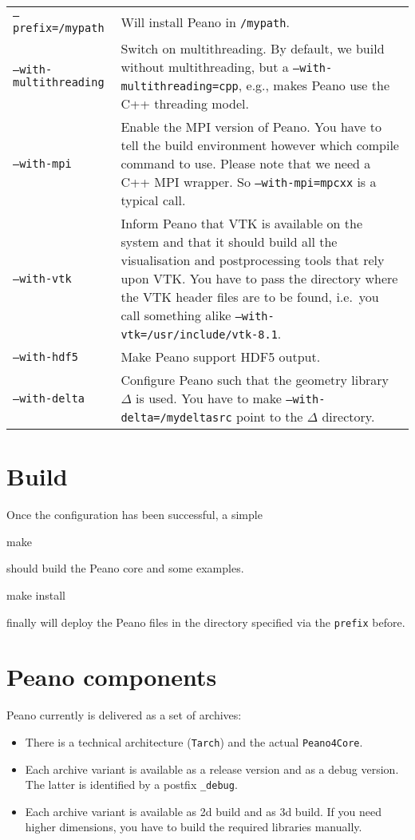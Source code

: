 \begin{center}
 \begin{tabular}{lp{10cm}}
  \texttt{--prefix=/mypath} & Will install Peano in \texttt{/mypath}.
   \\
  \texttt{--with-multithreading} & Switch on multithreading. By default, we
  build without multithreading, but a \texttt{--with-multithreading=cpp}, e.g.,
  makes Peano use the C++ threading model. 
   \\
  \texttt{--with-mpi} & Enable the MPI version of Peano. You have to tell the
  build environment however which compile command to use. Please note that
  we need a C++ MPI wrapper. So \texttt{--with-mpi=mpcxx} is a typical call. 
   \\
  \texttt{--with-vtk} & Inform Peano that VTK is available on the system and
  that it should build all the visualisation and postprocessing tools that rely
  upon VTK. You have to pass the directory where the VTK header files are to be
  found, i.e.~you call something alike \texttt{--with-vtk=/usr/include/vtk-8.1}.
   \\
  \texttt{--with-hdf5} & Make Peano support HDF5 output. 
   \\
  \texttt{--with-delta} & Configure Peano such that the geometry library
  $\Delta $ is used. You have to make \texttt{--with-delta=/mydeltasrc} point
  to the $\Delta $ directory.
 \end{tabular}
\end{center}


\section{Build}

Once the configuration has been successful, a simple 
\begin{code}
make
\end{code}
should build the Peano core and some examples.


\begin{code}
make install
\end{code}
finally will deploy the Peano files in the directory specified via the
\texttt{prefix} before.


\section{Peano components}

Peano currently is delivered as a set of archives:
\begin{itemize}
  \item There is a technical architecture (\texttt{Tarch}) and the actual
  \texttt{Peano4Core}.
  \item Each archive variant is available as a release version and as a debug
  version. The latter is identified by a postfix \texttt{\_debug}.
  \item Each archive variant is available as 2d build and as 3d build. If you
  need higher dimensions, you have to build the required libraries manually.
\end{itemize}


